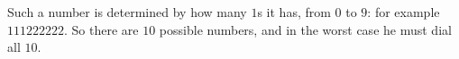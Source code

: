Such a number is determined by how many $1$s it has, from $0$ to $9$: for example $111222222$. So there are $10$ possible numbers, and in the worst case he must dial all $\boxed{10}$.
